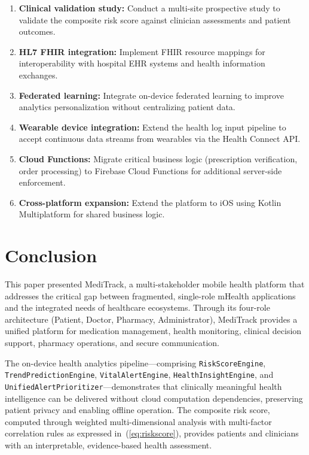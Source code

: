 \documentclass[journal,onecolumn,web]{ieeecolor}
\begin{document}
\begin{enumerate}
\item {\bf Clinical validation study:} Conduct a
multi-site prospective study to validate the
composite risk score against clinician assessments
and patient outcomes.
\item {\bf HL7 FHIR integration:} Implement FHIR
resource mappings for interoperability with hospital
EHR systems and health information exchanges.
\item {\bf Federated learning:} Integrate on-device
federated learning to improve analytics
personalization without centralizing patient data.
\item {\bf Wearable device integration:} Extend the
health log input pipeline to accept continuous data
streams from wearables via the Health Connect API.
\item {\bf Cloud Functions:} Migrate critical business
logic (prescription verification, order processing)
to Firebase Cloud Functions for additional
server-side enforcement.
\item {\bf Cross-platform expansion:} Extend the
platform to iOS using Kotlin Multiplatform for shared
business logic.
\end{enumerate}


\section{Conclusion}
\label{sec:conclusion}

This paper presented MediTrack, a multi-stakeholder
mobile health platform that addresses the critical gap
between fragmented, single-role mHealth applications
and the integrated needs of healthcare ecosystems.
Through its four-role architecture (Patient, Doctor,
Pharmacy, Administrator), MediTrack provides a unified
platform for medication management, health monitoring,
clinical decision support, pharmacy operations, and
secure communication.

The on-device health analytics pipeline---comprising
{\tt RiskScoreEngine}, {\tt TrendPredictionEngine},
{\tt VitalAlertEngine}, {\tt HealthInsightEngine},
and {\tt UnifiedAlertPrioritizer}---demonstrates that
clinically meaningful health intelligence can be
delivered without cloud computation dependencies,
preserving patient privacy and enabling offline
operation. The composite risk score, computed through
weighted multi-dimensional analysis with multi-factor
correlation rules as expressed
in~(\ref{eq:riskscore}), provides patients and
clinicians with an interpretable, evidence-based
health assessment.
\end{document}

